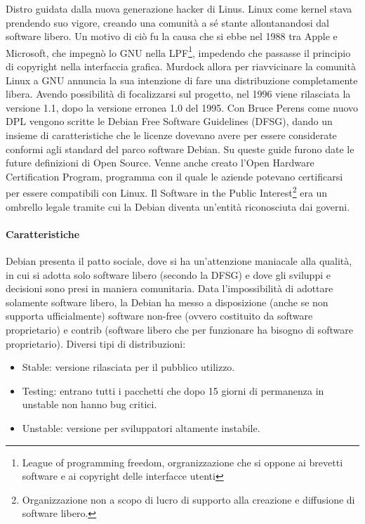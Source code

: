Distro guidata dalla nuova generazione hacker di Linus. Linux come kernel stava prendendo suo vigore, creando una comunit\`a a sé stante allontanandosi dal software libero. Un motivo di ci\`o fu la causa che si ebbe nel 1988 tra Apple e Microsoft, che impegn\`o lo GNU nella LPF\footnote{League of programming freedom, orgranizzazione che si oppone ai brevetti software e ai copyright delle interfacce utenti}, impedendo che passasse il principio di copyright nella interfaccia grafica. Murdock allora per riavvicinare la comunit\`a Linux a GNU annuncia la sua intenzione di fare una distribuzione completamente libera. Avendo possibilit\`a di focalizzarsi sul progetto, nel 1996 viene rilasciata la versione 1.1, dopo la versione erronea 1.0 del 1995. Con Bruce Perens come nuovo DPL vengono scritte le Debian Free Software Guidelines (DFSG), dando un insieme di caratteristiche che le licenze dovevano avere per essere considerate conformi agli standard del parco software Debian. Su queste guide furono date le future definizioni di Open Source. Venne anche creato l'Open Hardware Certification Program, programma con il quale le aziende potevano certificarsi per essere compatibili con Linux. Il Software in the Public Interest\footnote{Organizzazione non a scopo di lucro di supporto alla creazione e diffusione di software libero.} era un ombrello legale tramite cui la Debian diventa un'entit\`a riconosciuta dai governi.

\paragraph*{Caratteristiche} Debian presenta il patto sociale, dove si ha un'attenzione maniacale alla qualit\`a, in cui si adotta solo software libero (secondo la DFSG) e dove gli sviluppi e decisioni sono presi in maniera comunitaria. Data l'impossibilit\`a di adottare solamente software libero, la Debian ha messo a disposizione (anche se non supporta ufficialmente) software non-free (ovvero costituito da software proprietario) e contrib (software libero che per funzionare ha bisogno di software proprietario). Diversi tipi di distribuzioni:
\begin{itemize}
  
\item Stable: versione rilasciata per il pubblico utilizzo.
\item Testing: entrano tutti i pacchetti che dopo 15 giorni di permanenza in unstable non hanno bug critici.
\item Unstable: versione per sviluppatori altamente instabile.

\end{itemize}

